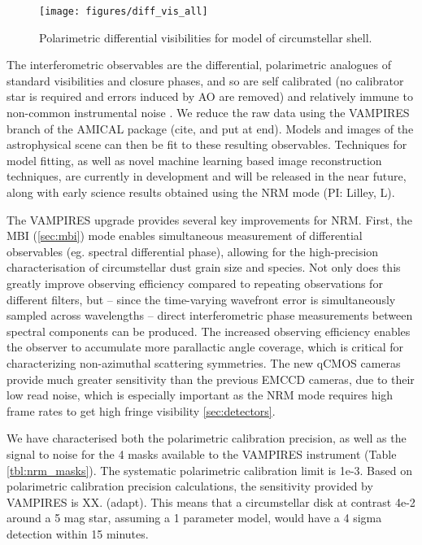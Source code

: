 \begin{figure}[h]
\centering
    \texttt{[image: figures/diff\_vis\_all]}
    \caption{Polarimetric differential visibilities for model of circumstellar shell. \label{fig:diff_vis_all}}
\end{figure}

The interferometric observables are the differential, polarimetric analogues of standard visibilities and closure phases, and so are self calibrated (no calibrator star is required and errors induced by AO are removed) and relatively immune to non-common instrumental noise \citep{norris_vampires_2015}. We reduce the raw data using the VAMPIRES branch of the AMICAL package (cite, and put at end). Models and images of the astrophysical scene can then be fit to these resulting observables. Techniques for model fitting, as well as novel machine learning based image reconstruction techniques, are currently in development and will be released in the near future, along with early science results obtained using the NRM mode (PI: Lilley, L). 
 
The VAMPIRES upgrade provides several key improvements for NRM. First, the MBI (\autoref{sec:mbi}) mode enables simultaneous measurement of differential observables (eg. spectral differential phase), allowing for the high-precision characterisation of circumstellar dust grain size and species. Not only does this greatly improve observing efficiency compared to repeating observations for different filters, but -- since the time-varying wavefront error is simultaneously sampled across wavelengths -- direct interferometric phase measurements between spectral components can be produced. 
The increased observing efficiency enables the observer to accumulate more parallactic angle coverage, which is critical for characterizing non-azimuthal scattering symmetries. The new qCMOS cameras provide much greater sensitivity than the previous EMCCD cameras, due to their low read noise, which is especially important as the NRM mode requires high frame rates to get high fringe visibility \autoref{sec:detectors}.  
 
We have characterised both the polarimetric calibration precision, as well as the signal to noise for the 4 masks available to the VAMPIRES instrument (Table \ref{tbl:nrm_masks}). The systematic polarimetric calibration limit is 1e-3. Based on polarimetric calibration precision calculations, the sensitivity provided by VAMPIRES is XX. (adapt). This means that a circumstellar disk at contrast 4e-2 around a 5 mag star, assuming a 1 parameter model, would have a 4 sigma detection within 15 minutes. 

